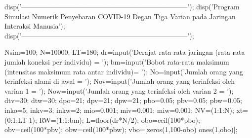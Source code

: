 disp('------------------------------------------------------------------------');
disp('Program Simulasi Numerik Penyebaran COVID-19 Degan Tiga Varian pada Jaringan Interaksi Manusia');
disp('------------------------------------------------------------------------');


Nsim=100; %
N=10000; %
LT=180; %
dr=input('Derajat rata-rata jaringan (rata-rata jumlah koneksi per individu) = '); %
bm=input('Bobot rata-rata maksimum (intensitas maksimum rata antar individu)= '); %
No=input('Jumlah orang yang terinfeksi alami di awal = '); %
Nov=input('Jumlah orang yang terinfeksi oleh varian 1 = '); %
Now=input('Jumlah orang yang terinfeksi oleh varian 2 = ');
dtv=30; %
dtw=30; %
dpo=21; %
dpv=21; %
dpw=21; %
pbo=0.05; %
pbv=0.05; %
pbw=0.05; %
inko=5; %
inkv=3; %
inkw=2; %
mio=0.001; %
miv=0.001; %
miw=0.001; %
NV=(1:1:N); %
xt=(0:1:LT-1); %
RW=(1:1:bm); %
L=floor(dr*N/2);
obo=ceil(100*pbo);
obv=ceil(100*pbv);
obw=ceil(100*pbw);
vbo=[zeros(1,100-obo) ones(1,obo)];                                                                
